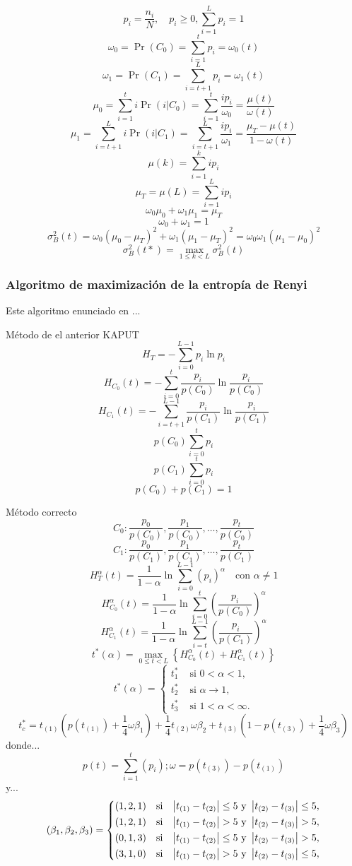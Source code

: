 $$p_i = \frac{n_i}{N}, \quad p_i \geq 0, \sum_{i=1}^{L}p_i=1$$
$$\omega_0 = \Pr(C_0) = \sum_{i=1}^{t}p_i=\omega_0(t)$$
$$\omega_1 = \Pr(C_1) = \sum_{i=t+1}^{L}p_i=\omega_1(t)$$
$$\mu_0=\sum_{i=1}^t i \Pr(i|C_0) = \sum_{i=1}^t \frac{ip_i}{\omega_0} = \frac{\mu(t)}{\omega(t)}$$
$$\mu_1=\sum_{i=t+1}^{L} i \Pr(i|C_1) = \sum_{i=t+1}^{L} \frac{ip_i}{\omega_1} = \frac{\mu_T-\mu(t)}{1-\omega(t)}$$
$$\mu(k)=\sum_{i=1}^k ip_i$$
$$\mu_T = \mu(L) = \sum_{i=1}^L ip_i$$
$$\omega_0\mu_0+\omega_1\mu_1 = \mu_T$$
$$\omega_0+\omega_1 = 1$$
$$\sigma_B^2(t) = \omega_0(\mu_0-\mu_T)^2 + \omega_1(\mu_1-\mu_T)^2 = \omega_0\omega_1(\mu_1-\mu_0)^2$$
$$\sigma_B^2(t*) = \max_{1\leq k <L}\sigma_B^2(t)$$

\subsubsection{Algoritmo de maximización de la entropía de Renyi}
Este algoritmo enunciado en \cite{art:sahoo}...



Método de el anterior KAPUT
$$H_T=-\sum_{i=0}^{L-1} p_i \ln p_i$$
$$H_{C_0}(t)=-\sum_{i=0}^{t} \frac{p_i}{p(C_0)} \ln \frac{p_i}{p(C_0)}$$
$$H_{C_1}(t)=-\sum_{i=t+1}^{L-1} \frac{p_i}{p(C_1)} \ln \frac{p_i}{p(C_1)}$$
$$p(C_0)\sum_{i=0}^{t}p_i$$
$$p(C_1)\sum_{i=0}^{t}p_i$$
$$p(C_0)+p(C_1)=1$$

Método correcto
$$C_0:\frac{p_0}{p(C_0)},\frac{p_1}{p(C_0)},\dots,\frac{p_t}{p(C_0)}$$
$$C_1:\frac{p_0}{p(C_1)},\frac{p_1}{p(C_1)},\dots,\frac{p_t}{p(C_1)}$$
$$H_{T}^{\alpha}(t) = \frac{1}{1-\alpha}\ln \sum_{i=0}^{L-1}\left(p_i\right)^\alpha \quad\text{con }\alpha\neq 1$$
$$H_{C_0}^{\alpha}(t) = \frac{1}{1-\alpha}\ln \sum_{i=0}^{t}\left(\frac{p_i}{p(C_0)}\right)^\alpha$$
$$H_{C_1}^{\alpha}(t) = \frac{1}{1-\alpha}\ln \sum_{i=t}^{L-1}\left(\frac{p_i}{p(C_1)}\right)^\alpha$$
$$t^*(\alpha)=\max_{0\leq t<L}\left\{H_{C_0}^{\alpha}(t)+H_{C_1}^{\alpha}(t)\right\}$$
$$t^*(\alpha)=\left\{\begin{aligned}
    t^*_1 & \text{  si  }0<\alpha<1,\\
    t^*_2 & \text{  si  }\alpha\rightarrow1,\\
    t^*_3 & \text{  si  }1<\alpha<\infty.
\end{aligned}\right.$$
$$t^*_c = t_{(1)} \left(p(t_{(1)})+\frac{1}{4}\omega\beta_1\right)
        + \frac{1}{4}t_{(2)}\omega\beta_2
        + t_{(3)} \left(1-p(t_{(3)})+\frac{1}{4}\omega\beta_3\right)$$
donde...
$$p(t)=\sum_{i=1}^t(p_i); \omega=p(t_{(3)})-p(t_{(1)})$$
y...
$$(\beta_1, \beta_2, \beta_3) =  \left\{\begin{aligned}
    (1, 2, 1) & \quad\text{si} &\left\vert t_{(1)}-t_{(2)}\right\vert\leq 5 \text{ y } \left\vert t_{(2)}-t_{(3)}\right\vert\leq 5,\\
    (1, 2, 1) & \quad\text{si} &\left\vert t_{(1)}-t_{(2)}\right\vert  >  5 \text{ y } \left\vert t_{(2)}-t_{(3)}\right\vert  >  5,\\
    (0, 1, 3) & \quad\text{si} &\left\vert t_{(1)}-t_{(2)}\right\vert\leq 5 \text{ y } \left\vert t_{(2)}-t_{(3)}\right\vert  >  5,\\
    (3, 1, 0) & \quad\text{si} &\left\vert t_{(1)}-t_{(2)}\right\vert  >  5 \text{ y } \left\vert t_{(2)}-t_{(3)}\right\vert\leq 5,   
\end{aligned}\right.$$

